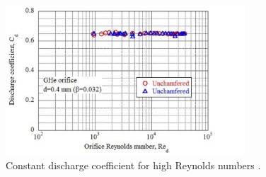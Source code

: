 \documentclass{article}
\begin{document}
\begin{figure}[H]
    \centering
    \includegraphics[width=0.8\textwidth]{Graham_K_Webster_const_Cd_Re.png}
    \caption{Constant discharge coefficient for high Reynolds numbers \cite{Graham_K_Webster:2019}.}
    \label{fig:const_Cd_Re}
\end{figure}



\end{document}
